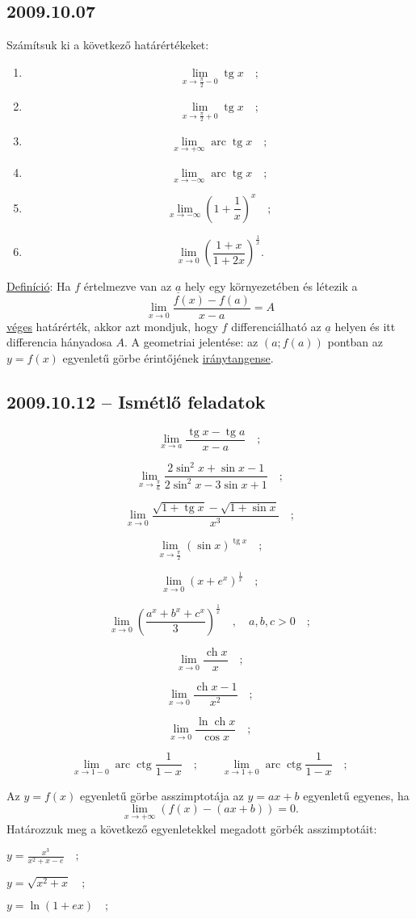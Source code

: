 \documentclass{article}
\newenvironment{abc3}{\begin{enumerate}[label=\textit{\alph*})]\begin{multicols}{3}}{\end{multicols}\end{enumerate}}
\newcommand{\tg}{\mathop{\mathrm{tg}}\nolimits}
\newcommand{\ctg}{\mathop{\mathrm{ctg}}\nolimits}
\newcommand{\arc}{\mathop{\mathrm{arc}}\nolimits}
\newcommand{\arctg}{\arc\tg}
\newcommand{\arcctg}{\arc\ctg}
\newcommand{\ch}{\mathop{\mathrm{ch}}\nolimits}
\begin{document}
\subsection*{2009.10.07}
Számítsuk ki a következő határértékeket:
\begin{enumerate}
\item $$\lim_{x\to \frac{\pi}{2}-0}\tg x\quad;$$
\item $$\lim_{x\to \frac{\pi}{2}+0}\tg x\quad;$$
\item $$\lim_{x\to +\infty}{\arctg x}\quad;$$
\item $$\lim_{x\to -\infty}{\arctg x}\quad;$$
\item $$\lim_{x\to -\infty}\left(1+\frac{1}{x}\right)^x\quad;$$
\item $$\lim_{x\to 0}\left(\frac{1+x}{1+2x}\right)^{\frac{1}{x}}.$$
\end{enumerate}

\noindent\underline{Definíció}: Ha $f$ értelmezve van az $\underline{a}$ hely egy környezetében és létezik a 
$$\lim_{x\to 0}\frac{f(x)-f(a)}{x-a}=A$$
\underline{véges} határérték, akkor azt mondjuk, hogy $f$ differenciálható az $\underline{a}$ helyen és itt differencia hányadosa $A$. A geometriai jelentése: az $(a;f(a))$ pontban az $y=f(x)$ egyenletű görbe érintőjének \underline{iránytangense}.
\subsection*{2009.10.12 -- Ismétlő feladatok}
\begin{enumerate}
\item $$\lim_{x\to a}\frac{\tg x-\tg a}{x-a}\quad;$$
\item $$\lim_{x\to \frac{\pi}{6}}\frac{2\sin ^2 x+\sin x-1}{2\sin ^2 x-3\sin x+1}\quad;$$
\item $$\lim_{x\to 0}\frac{\sqrt{1+\tg x}-\sqrt{1+\sin x}}{x^3}\quad;$$
\item $$\lim_{x\to \frac{\pi}{2}}(\sin x)^{\tg x}\quad;$$
\item $$\lim_{x\to 0}\left(x+e^x\right)^{\frac{1}{x}}\quad;$$
\item $$\lim_{x\to 0}\left(\frac{a^x+b^x+c^x}{3}\right)^{\frac{1}{x}}\quad,\quad a,b,c>0\quad;$$
\item $$\lim_{x\to 0}\frac{\ch x}{x}\quad;$$
\item $$\lim_{x\to 0}\frac{\ch x-1}{x^2}\quad;$$
\item $$\lim_{x\to 0}\frac{\ln \ch x}{\cos x}\quad;$$
\item $$\lim_{x\to 1-0}\arcctg\frac{1}{1-x}\quad;\qquad\lim_{x\to 1+0}\arcctg\frac{1}{1-x}\quad;$$
\item Az $y=f(x)$ egyenletű görbe asszimptotája az $y=ax+b$ egyenletű egyenes, ha
$$\lim_{x\to +\infty}\left(f(x)-(ax+b)\right)=0.$$
Határozzuk meg a következő egyenletekkel megadott görbék asszimptotáit:
\begin{abc3}
\item $y=\frac{x^3}{x^2+x-e}\quad;$
\item $y=\sqrt{x^2+x}\quad;$
\item $y=\ln(1+ex)\quad;$
\end{abc3}
\end{enumerate}
\end{document}
